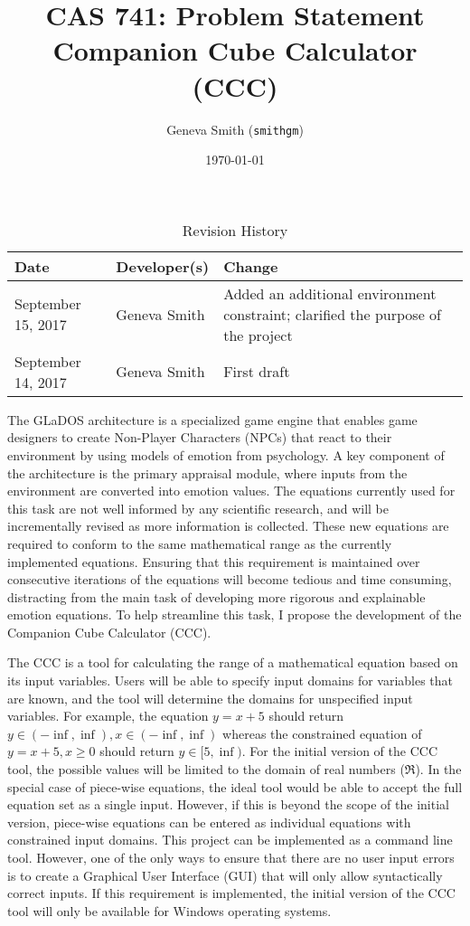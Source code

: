 \documentclass{article}
\title{CAS 741: Problem Statement\\Companion Cube Calculator (CCC)}
\author{Geneva Smith (\texttt{smithgm})}
\date{\today}
\begin{document}
\maketitle

\begin{table}[hp]
\caption{Revision History} \label{TblRevisionHistory}
\begin{tabularx}{\textwidth}{llX}
\toprule
\textbf{Date} & \textbf{Developer(s)} & \textbf{Change}\\
\midrule
September 15, 2017 & Geneva Smith & Added an additional environment constraint; 
clarified the purpose of the project \\
September 14, 2017 & Geneva Smith & First draft \\
\bottomrule
\end{tabularx}
\end{table}

The GLaDOS architecture\cite{glados} is a specialized game engine that enables 
game designers to create Non-Player Characters (NPCs) that react to their 
environment by using models of emotion from psychology. A key component of the 
architecture is the primary appraisal module, where inputs from the environment 
are converted into emotion values. The equations currently used for this task 
are not well informed by any scientific research, and will be incrementally 
revised as more information is collected. These new equations are required to 
conform to the same mathematical range as the currently implemented equations. 
Ensuring that this requirement is maintained over consecutive iterations of the 
equations will become tedious and time consuming, distracting from the main 
task of developing more rigorous and explainable emotion equations. To help 
streamline this task, I propose the development of the Companion Cube 
Calculator (CCC).

The CCC is a tool for calculating the range of a mathematical equation based on 
its input variables. Users will be able to specify input domains for variables 
that are known, and the tool will determine the domains for unspecified input 
variables. For example, the equation $y = x + 5$ should return $y \in (-\inf, 
\inf), x \in (-\inf, \inf)$ whereas the constrained equation of $y = x + 5, x 
\geq 0$ should return $y \in [5, \inf)$. For the initial version of the CCC 
tool, the possible values will be limited to the domain of real numbers 
($\Re$). In the special case of piece-wise equations, the ideal tool would be 
able to accept the full equation set as a single input. However, if this is 
beyond the scope of the initial version, piece-wise equations can be entered as 
individual equations with constrained input domains. This project can be 
implemented as a command line tool. However, one of the only ways to ensure 
that there are no user input errors is to create a Graphical User Interface 
(GUI) that will only allow syntactically correct inputs. If this requirement is 
implemented, the initial version of the CCC tool will only be available for 
Windows operating systems.
\end{document}
